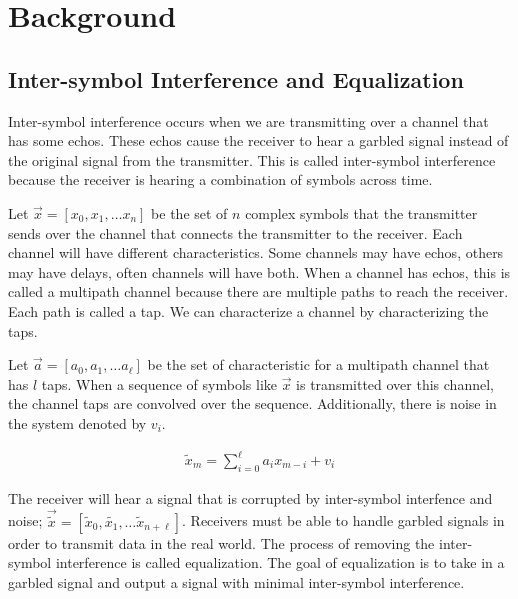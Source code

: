 \section{Background}

\subsection{Inter-symbol Interference and Equalization}

Inter-symbol interference occurs when we are transmitting over a channel that has some echos.  These echos cause the receiver to hear a garbled signal instead of the original signal from the transmitter.  This is called inter-symbol interference because the receiver is hearing a combination of symbols across time. 

Let $\vec{x}=[x_0, x_1, \ldots x_n]$ be the set of $n$ complex symbols that the transmitter sends over the channel that connects the transmitter to the receiver.
Each channel will have different characteristics. Some channels may have echos, others may have delays, often channels will have both.  When a channel has echos, this is called a multipath channel because there are multiple paths to reach the receiver.  Each path is called a tap.  We can characterize a channel by characterizing the taps.

Let $\vec{a} = [a_0, a_1, \ldots a_{\ell}]$ be the set of characteristic for a multipath channel that has $l$ taps. When a sequence of symbols like $\vec{x}$ is transmitted over this channel, the channel taps are convolved over the sequence.  Additionally, there is noise in the system denoted by $v_i$. 

\begin{align}
\tilde{x}_m = \sum_{i=0}^{\ell} a_i x_{m-i} + v_i
\end{align}

The receiver will hear a signal that is corrupted by inter-symbol interfence and noise;
$\vec{\tilde{x}}=[\tilde{x}_0, \tilde{x_1}, \ldots \tilde{x}_{n+\ell}]$. 
Receivers must be able to handle garbled signals in order to transmit data in the real world.  The process of removing the inter-symbol interference is called equalization.  The goal of equalization is to take in a garbled signal and output a signal with minimal inter-symbol interference. 

